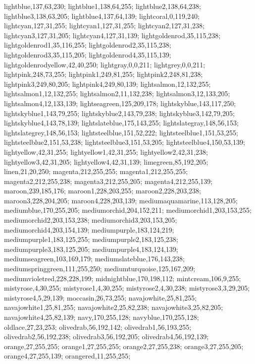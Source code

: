 {lightblue,137,63,230;%
lightblue1,138,64,255;%
lightblue2,138,64,238;%
lightblue3,138,63,205;%
lightblue4,137,64,139;%
lightcoral,0,119,240;%
lightcyan,127,31,255;%
lightcyan1,127,31,255;%
lightcyan2,127,31,238;%
lightcyan3,127,31,205;%
lightcyan4,127,31,139;%
lightgoldenrod,35,115,238;%
lightgoldenrod1,35,116,255;%
lightgoldenrod2,35,115,238;%
lightgoldenrod3,35,115,205;%
lightgoldenrod4,35,115,139;%
lightgoldenrodyellow,42,40,250;%
lightgray,0,0,211;%
lightgrey,0,0,211;%
lightpink,248,73,255;%
lightpink1,249,81,255;%
lightpink2,248,81,238;%
lightpink3,249,80,205;%
lightpink4,249,80,139;%
lightsalmon,12,132,255;%
lightsalmon1,12,132,255;%
lightsalmon2,11,132,238;%
lightsalmon3,12,133,205;%
lightsalmon4,12,133,139;%
lightseagreen,125,209,178;%
lightskyblue,143,117,250;%
lightskyblue1,143,79,255;%
lightskyblue2,143,79,238;%
lightskyblue3,142,79,205;%
lightskyblue4,143,78,139;%
lightslateblue,175,143,255;%
lightslategray,148,56,153;%
lightslategrey,148,56,153;%
lightsteelblue,151,52,222;%
lightsteelblue1,151,53,255;%
lightsteelblue2,151,53,238;%
lightsteelblue3,151,53,205;%
lightsteelblue4,150,53,139;%
lightyellow,42,31,255;%
lightyellow1,42,31,255;%
lightyellow2,42,31,238;%
lightyellow3,42,31,205;%
lightyellow4,42,31,139;%
limegreen,85,192,205;%
linen,21,20,250;%
magenta,212,255,255;%
magenta1,212,255,255;%
magenta2,212,255,238;%
magenta3,212,255,205;%
magenta4,212,255,139;%
maroon,239,185,176;%
maroon1,228,203,255;%
maroon2,228,203,238;%
maroon3,228,204,205;%
maroon4,228,203,139;%
mediumaquamarine,113,128,205;%
mediumblue,170,255,205;%
mediumorchid,204,152,211;%
mediumorchid1,203,153,255;%
mediumorchid2,203,153,238;%
mediumorchid3,203,153,205;%
mediumorchid4,203,154,139;%
mediumpurple,183,124,219;%
mediumpurple1,183,125,255;%
mediumpurple2,183,125,238;%
mediumpurple3,183,125,205;%
mediumpurple4,183,124,139;%
mediumseagreen,103,169,179;%
mediumslateblue,176,143,238;%
mediumspringgreen,111,255,250;%
mediumturquoise,125,167,209;%
mediumvioletred,228,228,199;%
midnightblue,170,198,112;%
mintcream,106,9,255;%
mistyrose,4,30,255;%
mistyrose1,4,30,255;%
mistyrose2,4,30,238;%
mistyrose3,3,29,205;%
mistyrose4,5,29,139;%
moccasin,26,73,255;%
navajowhite,25,81,255;%
navajowhite1,25,81,255;%
navajowhite2,25,82,238;%
navajowhite3,25,82,205;%
navajowhite4,25,82,139;%
navy,170,255,128;%
navyblue,170,255,128;%
oldlace,27,23,253;%
olivedrab,56,192,142;%
olivedrab1,56,193,255;%
olivedrab2,56,192,238;%
olivedrab3,56,192,205;%
olivedrab4,56,192,139;%
orange,27,255,255;%
orange1,27,255,255;%
orange2,27,255,238;%
orange3,27,255,205;%
orange4,27,255,139;%
orangered,11,255,255;%
}
